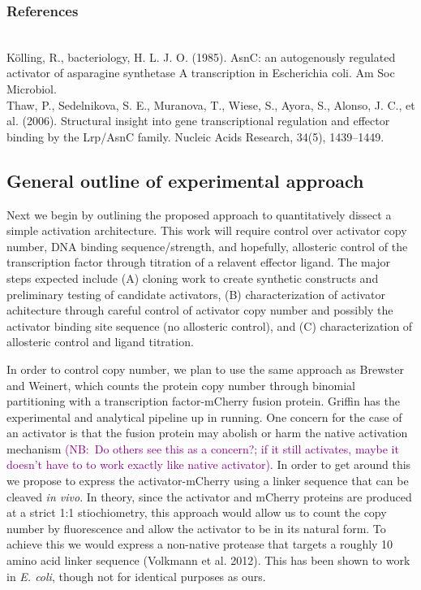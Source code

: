 \documentclass[12pt]{article}
\newcommand{\NBComment}[1]{\textcolor{purple}{(NB:~#1)}}
\begin{document}
\subsubsection*{References} \\

\noindent Kölling, R., bacteriology, H. L. J. O. (1985). AsnC: an autogenously regulated
activator of asparagine synthetase A transcription in Escherichia coli. Am Soc
Microbiol.\\

\noindent Thaw, P., Sedelnikova, S. E., Muranova, T., Wiese, S., Ayora, S., Alonso, J. C.,
et al. (2006). Structural insight into gene transcriptional regulation and
effector binding by the Lrp/AsnC family. Nucleic Acids Research, 34(5),
1439–1449.


\subsection*{General outline of experimental approach}

Next we begin by outlining the proposed approach to quantitatively dissect a
simple activation architecture. This work will require control over activator
copy number, DNA binding sequence/strength, and hopefully, allosteric control of
the transcription factor through titration of a relavent effector ligand. The
major steps expected include (A) cloning work to create synthetic constructs
and preliminary testing of candidate activators, (B) characterization of
activator achitecture through careful control of activator copy number and
possibly the activator binding site sequence (no allosteric control),  and (C)
characterization of allosteric control and ligand titration.

In order to control copy number, we plan to use the same approach as Brewster
and Weinert, which counts the protein copy number through binomial partitioning
with a transcription factor-mCherry fusion protein. Griffin has the experimental
and analytical pipeline up in running. One concern for the case of an activator
is that the fusion protein may abolish or harm the native activation mechanism
\NBComment{Do others see this as a concern?; if it still activates, maybe it
doesn't have to to work exactly like native activator}. In order to  get around
this we propose to express the activator-mCherry using a linker sequence that
can be cleaved \textit{in vivo}. In theory, since the activator and mCherry
proteins are produced at a strict 1:1 stiochiometry,  this approach would allow us to
count the copy number by fluorescence and allow the activator to be in its
natural form. To achieve this we would express a non-native protease that targets
a roughly 10 amino acid linker sequence (Volkmann et al. 2012). This has been shown to work in
\textit{E. coli}, though not for identical purposes as ours.
\end{document}
